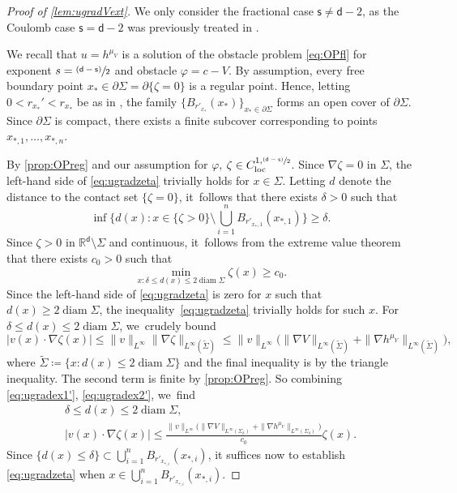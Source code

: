 \documentclass[10pt]{amsart}
\newcommand{\psfrac}[2]{\sfrac{(#1)}{#2}}
\newcommand{\loc}{\textup{loc}}
\theoremstyle{plain}
\theoremstyle{definition}
\DeclareMathOperator{\diam}{diam}
\newcommand{\R}{{\mathbb{R}}}
\let\nab\nabla
\let\p\partial
\let\tl\tilde
\renewcommand{\d}{\mathsf{d}}
\newcommand{\s}{\mathsf{s}}
\begin{document}
\begin{proof}[Proof of \cref{lem:ugradVext}]
We only consider the fractional case $\s\ne \d-2$, as the Coulomb case $\s=\d-2$ was previously treated in \cite[Lem.\,3.2]{BCGM2015}.

We recall that $u=h^{\mu_V}$ is a solution of the obstacle problem \eqref{eq:OPfl} for exponent ${s}=\psfrac{\d-\s}{2}$ and obstacle $\varphi=c-V$. By assumption, every free boundary point $x_*\in \p\Sigma = \p\{\zeta =0\}$ is a regular point. Hence, letting $0<r_{x_*}' < r_{x_*}$ be as in , the family $\{B_{r'_{x_*}}(x_*)\}_{x_*\in \p\Sigma}$ forms an open cover of $\p\Sigma$. Since $\p\Sigma$ is compact, there exists a finite subcover corresponding to points $x_{*,1},\ldots,x_{*,n}$.

By \cref{prop:OPreg} and our assumption for $\varphi$, $\zeta\in C_{\loc}^{1,\psfrac{\d-\s}{2}}$. Since $\nab\zeta = 0$ in $\Sigma$, the left-hand side of \eqref{eq:ugradzeta} trivially holds for $x\in\Sigma$. Letting $d$ denote the distance to the contact set $\{\zeta =0\}$, it~follows that there exists $\delta>0$ such that
\[\textstyle
\inf\bigl\{ d(x) : x \in \{\zeta > 0\} \setminus \bigcup_{i=1}^n B_{r'_{x_*,1}}(x_{*,1})\bigr\} \ge \delta.
\]
Since $\zeta>0$ in $\R^\d\setminus\Sigma$ and continuous, it~follows from the extreme value theorem that there exists $c_0>0$ such that
\begin{equation}\label{eq:ugradex1'}
\min_{x : \delta \le d(x) \le 2\diam\Sigma} \zeta(x) \ge c_0.
\end{equation}
Since the left-hand side of \eqref{eq:ugradzeta} is zero for $x$ such that $d(x)\ge 2\diam\Sigma$, the inequality~\eqref{eq:ugradzeta} trivially holds for such $x$. For {$\delta\le d(x)\le 2\diam \Sigma$}, we~crudely bound
\begin{equation}\label{eq:ugradex2'}
|v(x)\cdot \nab\zeta(x)|\le \|v\|_{L^\infty}\|\nab\zeta\|_{L^\infty(\tl\Sigma)} \le \|v\|_{L^\infty}\Big(\|\nab V\|_{L^\infty(\tl\Sigma)} + \|\nab h^{\mu_V}\|_{L^\infty(\tl\Sigma)}\Big),
\end{equation}
where {$\tl\Sigma \coloneqq \{x: d(x)\le 2\diam\Sigma\}$ and the final inequality is by the triangle inequality}. The second term is finite by \cref{prop:OPreg}. So combining \eqref{eq:ugradex1'}, \eqref{eq:ugradex2'}, we~find
\begin{equation}\label{eq:ugradex3'}
\begin{gathered}
\delta\le d(x)\le 2\diam\Sigma, \\
|v(x)\cdot\nab\zeta(x)| \le \frac{\|v\|_{L^\infty}\Big(\|\nab V\|_{L^\infty(\Sigma_\delta)} + \|\nab h^{\mu_V}\|_{L^\infty(\Sigma_\delta)}\Big)}{c_0} \zeta(x).
\end{gathered}
\end{equation}
{Since $\{d(x)\le\delta\} \subset \bigcup_{i=1}^n B_{r'_{x_{*,i}}}(x_{*,i})$,} it suffices now to establish \eqref{eq:ugradzeta} when $x\in \bigcup_{i=1}^n B_{r'_{x_{*,i}}}(x_{*,i})$.


\end{proof}
\end{document}
